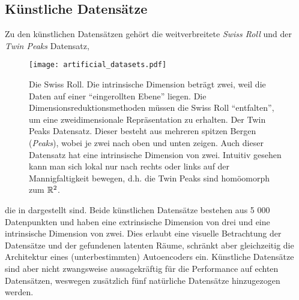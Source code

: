 \subsection{Künstliche Datensätze}
\label{ch:Vergleich:sec:VerwendeteDatensaetze:kuenstlich}
Zu den künstlichen Datensätzen gehört die weitverbreitete \textit{Swiss Roll} und der \textit{Twin Peaks} Datensatz,
\begin{figure}[ht]
	\begin{center}
		\texttt{[image: artificial\_datasets.pdf]}
	\end{center}
	\caption[Künstliche Datensätze]{\figleft Die Swiss Roll. Die intrinsische Dimension beträgt zwei, weil die Daten auf einer \enquote{eingerollten Ebene} liegen. Die Dimensionsreduktionsmethoden müssen die Swiss Roll \enquote{entfalten}, um eine zweidimensionale Repräsentation zu erhalten. \figright Der Twin Peaks Datensatz. Dieser besteht aus mehreren spitzen Bergen (\textit{Peaks}), wobei je zwei nach oben und unten zeigen. Auch dieser Datensatz hat eine intrinsische Dimension von zwei. Intuitiv gesehen kann man sich lokal nur nach rechts oder links auf der Mannigfaltigkeit bewegen, d.h. die Twin Peaks sind homöomorph zum $\mathbb{R}^2$.}
	\label{fig:ArtificialDatasets}
\end{figure}
die in  dargestellt sind.
Beide künstlichen Datensätze bestehen aus 5 000 Datenpunkten und haben eine extrinsische Dimension von drei und eine intrinsische
Dimension von zwei. Dies erlaubt eine visuelle Betrachtung der Datensätze und der gefundenen
latenten Räume, schränkt aber gleichzeitig die Architektur eines (unterbestimmten) Autoencoders
ein. Künstliche Datensätze sind aber nicht zwangsweise aussagekräftig für die Performance auf echten Datensätzen, weswegen zusätzlich fünf natürliche Datensätze hinzugezogen werden.


